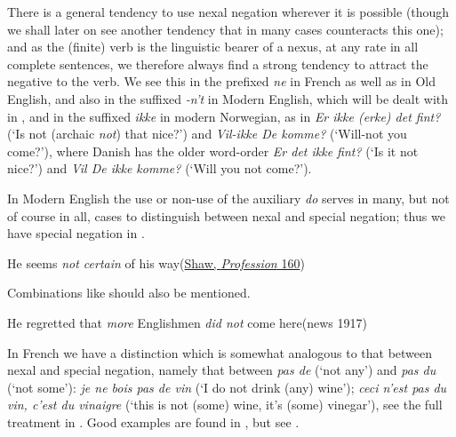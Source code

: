 \label{para:nexal-negation-tendency}There is a general tendency to use nexal negation wherever it is possible (though we shall later on see another tendency that in many cases counteracts this one); and as the (finite) verb is the linguistic bearer of a nexus, at any rate in all complete sentences, we therefore always find a strong tendency to attract the negative to the verb. We see this in the prefixed \textit{ne} in French as well as in Old English, and also in the suffixed \textit{-n't} in Modern English, which will be dealt with in , and in the suffixed \textit{ikke} in modern Norwegian, as in \textit{Er ikke (erke) det fint?} (`Is not (archaic \textit{not}) that nice?') and \textit{Vil-ikke De komme?} (`Will-not you come?'), where Danish has the older word-order \textit{Er det ikke fint?} (`Is it not nice?') and \textit{Vil De ikke komme?} (`Will you not come?').

In Modern English the use or non-use of the auxiliary \textit{do} serves in many, but not of course in all, cases to distinguish between nexal and special negation; thus we have special negation in .\label{p:nexal-sp}

\ea \label{ex:05-02}
He seems \textit{not certain} of his way\hfill(\href{https://archive.org/details/mrswarrensprofes00shawuoft/page/160/mode/2up?q=%22seems+not+certain%22}{Shaw, \textit{Profession} 160})
\z

Combinations like  should also be mentioned.

\ea \label{ex:05-03}
He regretted that \textit{more} Englishmen \textit{did not} come here\hfill(news 1917) %
\z{}

In French we have a distinction which is somewhat analogous to that between nexal and special negation, namely that between \textit{pas de} (`not any') and \textit{pas du} (`not some'): \textit{je ne bois pas de vin} (`I do not drink (any) wine'); \textit{ceci n'est pas du vin, c'est du vinaigre} (`this is not (some) wine, it's (some) vinegar'), see the full treatment in \citet[\href{https://www.nb.no/items/b6e32092abfe229e8854840d79878e30?page=113}{p.~87ff}]{storm1911storre}. Good examples are found in , but see %
. 

